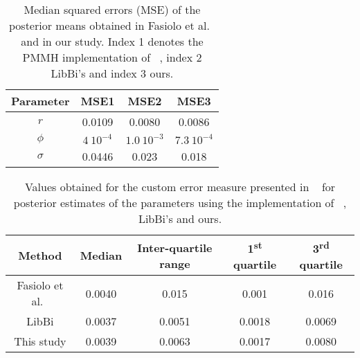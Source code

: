 \documentclass[12pt]{article}
\newcommand{\ra}[1]{\renewcommand{\arraystretch}{#1}}
\begin{document}
	\begin{table}[htb]
		\centering
		\vspace{10mm}
		\ra{1.3}
		\begin{tabular}{@{}cccc@{}} \toprule
			Parameter & MSE1 & MSE2 & MSE3\\ \midrule 
			$r$ & 0.0109 & 0.0080 &  0.0086 \\ 
			$\phi$ & $4 \ 10^{-4}$ & $1.0 \ 10^{-3}$ &  $7.3 \ 10^{-4}$ \\ 
			$\sigma$ & 0.0446 & 0.023 & 0.018  \\ \bottomrule
		\end{tabular}
		\caption[Comparison between the mean square errors of posterior estimates of the parameters obtain in this study and in Fasiolo et al.~\cite{fasiolo2014statistical} ]{Median squared errors (MSE) of the posterior means obtained in Fasiolo et al.~\cite{fasiolo2014statistical} and in our study. Index 1 denotes the PMMH implementation of ~\cite{fasiolo2014statistical}, index 2 LibBi's and index 3 ours.}
		\label{table:mse}
	\end{table}
	
	\begin{table}[htb]
		\centering
		\vspace{10mm}
		\ra{1.3}
		\begin{tabular}{@{}ccccc@{}} \toprule
			Method & Median &  Inter-quartile range & 1\textsuperscript{st} quartile & 3\textsuperscript{rd} quartile \\ \midrule 
			Fasiolo et al.~\cite{fasiolo2014statistical} & 0.0040 & 0.015 & 0.001 & 0.016\\ 
			LibBi & 0.0037 & 0.0051 & 0.0018 & 0.0069 \\ 
			This study & 0.0039 &  0.0063 & 0.0017 & 0.0080\\ \bottomrule
		\end{tabular}
		\caption[Comparison between Fasiolo et al.~\cite{fasiolo2014statistical} custom error measure for posterior estimates of the parameters obtain in this study and in ~\cite{fasiolo2014statistical} ]{Values obtained for the custom error measure presented in ~\cite{fasiolo2014statistical} for posterior estimates of the parameters using the implementation of ~\cite{fasiolo2014statistical}, LibBi's and ours.}
		\label{table:metric}
	\end{table}
	
\end{document}
